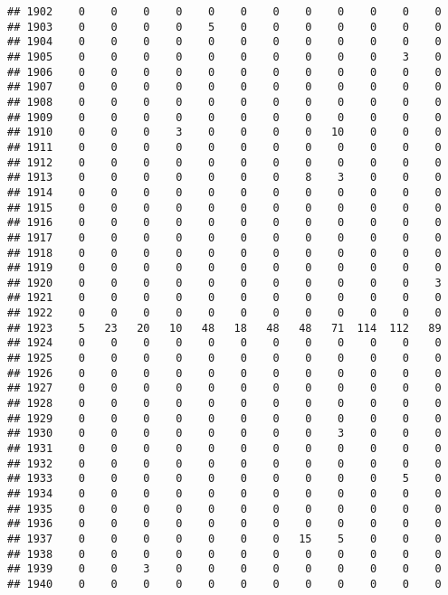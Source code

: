 \documentclass[]{article}
\begin{document}
\begin{verbatim}
## 1902    0    0    0    0    0    0    0    0    0    0    0    0
## 1903    0    0    0    0    5    0    0    0    0    0    0    0
## 1904    0    0    0    0    0    0    0    0    0    0    0    0
## 1905    0    0    0    0    0    0    0    0    0    0    3    0
## 1906    0    0    0    0    0    0    0    0    0    0    0    0
## 1907    0    0    0    0    0    0    0    0    0    0    0    0
## 1908    0    0    0    0    0    0    0    0    0    0    0    0
## 1909    0    0    0    0    0    0    0    0    0    0    0    0
## 1910    0    0    0    3    0    0    0    0   10    0    0    0
## 1911    0    0    0    0    0    0    0    0    0    0    0    0
## 1912    0    0    0    0    0    0    0    0    0    0    0    0
## 1913    0    0    0    0    0    0    0    8    3    0    0    0
## 1914    0    0    0    0    0    0    0    0    0    0    0    0
## 1915    0    0    0    0    0    0    0    0    0    0    0    0
## 1916    0    0    0    0    0    0    0    0    0    0    0    0
## 1917    0    0    0    0    0    0    0    0    0    0    0    0
## 1918    0    0    0    0    0    0    0    0    0    0    0    0
## 1919    0    0    0    0    0    0    0    0    0    0    0    0
## 1920    0    0    0    0    0    0    0    0    0    0    0    3
## 1921    0    0    0    0    0    0    0    0    0    0    0    0
## 1922    0    0    0    0    0    0    0    0    0    0    0    0
## 1923    5   23   20   10   48   18   48   48   71  114  112   89
## 1924    0    0    0    0    0    0    0    0    0    0    0    0
## 1925    0    0    0    0    0    0    0    0    0    0    0    0
## 1926    0    0    0    0    0    0    0    0    0    0    0    0
## 1927    0    0    0    0    0    0    0    0    0    0    0    0
## 1928    0    0    0    0    0    0    0    0    0    0    0    0
## 1929    0    0    0    0    0    0    0    0    0    0    0    0
## 1930    0    0    0    0    0    0    0    0    3    0    0    0
## 1931    0    0    0    0    0    0    0    0    0    0    0    0
## 1932    0    0    0    0    0    0    0    0    0    0    0    0
## 1933    0    0    0    0    0    0    0    0    0    0    5    0
## 1934    0    0    0    0    0    0    0    0    0    0    0    0
## 1935    0    0    0    0    0    0    0    0    0    0    0    0
## 1936    0    0    0    0    0    0    0    0    0    0    0    0
## 1937    0    0    0    0    0    0    0   15    5    0    0    0
## 1938    0    0    0    0    0    0    0    0    0    0    0    0
## 1939    0    0    3    0    0    0    0    0    0    0    0    0
## 1940    0    0    0    0    0    0    0    0    0    0    0    0

\end{verbatim}
\end{document}
